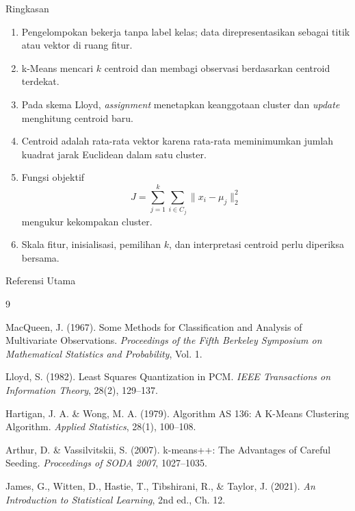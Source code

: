 \documentclass[aspectratio=169,11pt]{beamer}
\begin{document}
\begin{frame}{Ringkasan}
\small
\begin{enumerate}
\item Pengelompokan bekerja tanpa label kelas; data direpresentasikan sebagai titik atau vektor di ruang fitur.
\item k-Means mencari $k$ centroid dan membagi observasi berdasarkan centroid terdekat.
\item Pada skema Lloyd, \textit{assignment} menetapkan keanggotaan cluster dan \textit{update} menghitung centroid baru.
\item Centroid adalah rata-rata vektor karena rata-rata meminimumkan jumlah kuadrat jarak Euclidean dalam satu cluster.
\item Fungsi objektif
\[
J=\sum_{j=1}^{k}\sum_{i\in C_j}\|x_i-\mu_j\|_2^2
\]
mengukur kekompakan cluster.
\item Skala fitur, inisialisasi, pemilihan $k$, dan interpretasi centroid perlu diperiksa bersama.
\end{enumerate}
\end{frame}

\begin{frame}{Referensi Utama}
\footnotesize
\begin{thebibliography}{9}

MacQueen, J. (1967).
\newblock Some Methods for Classification and Analysis of Multivariate Observations.
\newblock \textit{Proceedings of the Fifth Berkeley Symposium on Mathematical Statistics and Probability}, Vol. 1.

Lloyd, S. (1982).
\newblock Least Squares Quantization in PCM.
\newblock \textit{IEEE Transactions on Information Theory}, 28(2), 129--137.

Hartigan, J. A. \& Wong, M. A. (1979).
\newblock Algorithm AS 136: A K-Means Clustering Algorithm.
\newblock \textit{Applied Statistics}, 28(1), 100--108.

Arthur, D. \& Vassilvitskii, S. (2007).
\newblock k-means++: The Advantages of Careful Seeding.
\newblock \textit{Proceedings of SODA 2007}, 1027--1035.

James, G., Witten, D., Hastie, T., Tibshirani, R., \& Taylor, J. (2021).
\newblock \textit{An Introduction to Statistical Learning}, 2nd ed., Ch. 12.

\end{thebibliography}
\end{frame}
\end{document}
